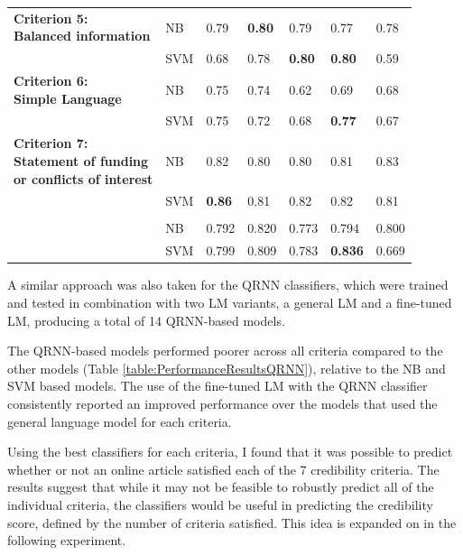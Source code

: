\documentclass[a4paper,twoside,phd]{BYUPhys}
\begin{document}
\begin{table}[H]
{\begin{tabular}{|p{6cm}|p{2.6cm}|p{2.6cm}|p{2.6cm}|p{2.6cm}|p{2.6cm}|p{2.6cm}|}
			
			\multirowcell{2}{\textbf{Criterion 5:} \\ \textbf{Balanced information}} 
			& NB & 0.79 & \textbf{0.80} & 0.79 & 0.77 & 0.78 \\ 
			& SVM & 0.68 & 0.78 & \textbf{0.80} & \textbf{0.80} & 0.59 \\
			\hline 
			
			
			\multirowcell{2}{\textbf{Criterion 6:} \\ \textbf{Simple Language}} & NB & 0.75 & 0.74 & 0.62 & 0.69 & 0.68 \\ 
			& SVM & 0.75 & 0.72 & 0.68 & \textbf{0.77} & 0.67 \\
			\hline 
			
			
			\multirowcell{3}{\textbf{Criterion 7:} \\ \textbf{Statement of funding} \\ \textbf{or conflicts of interest}} 
			& NB & 0.82 & 0.80 & 0.80 & 0.81 & 0.83 \\ 
			& SVM & \textbf{0.86} & 0.81 & 0.82 & 0.82 & 0.81 \\ & & & & & & \\ 
			\hline 
			
			
			\multirowcell{2}{\textbf{Average} \textbf{Performance}} & NB & 0.792 & 0.820 & 0.773 & 0.794 & 0.800      \\ 
			& SVM & 0.799 & 0.809 & 0.783 & \textbf{0.836} & 0.669      \\
			\hline                                                                                                                                          
	\end{tabular}}
	\label{table:PerformanceResultsNBSVM}
\end{table}

A similar approach was also taken for the QRNN classifiers, which were trained and tested in combination with two LM variants, a general LM and a fine-tuned LM, producing a total of 14 QRNN-based models. \newline

The QRNN-based models performed poorer across all criteria compared to the other models (Table \ref{table:PerformanceResultsQRNN}), relative to the NB and SVM based models. The use of the fine-tuned LM with the QRNN classifier consistently reported an improved performance over the models that used the general language model for each criteria. \newline

Using the best classifiers for each criteria, I found that it was possible to predict whether or not an online article satisfied each of the 7 credibility criteria. The results suggest that while it may not be feasible to robustly predict all of the individual criteria, the classifiers would be useful in predicting the credibility score, defined by the number of criteria satisfied. This idea is expanded on in the following experiment.
\end{document}

